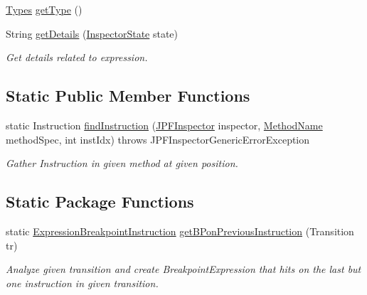 \begin{DoxyCompactItemize}
\hyperlink{enumgov_1_1nasa_1_1jpf_1_1inspector_1_1server_1_1expression_1_1_types}{Types} \hyperlink{classgov_1_1nasa_1_1jpf_1_1inspector_1_1server_1_1expression_1_1_expression_boolean_aed010ff8683eb1e8621e226703133457}{get\+Type} ()
\item 
String \hyperlink{classgov_1_1nasa_1_1jpf_1_1inspector_1_1server_1_1expression_1_1_expression_boolean_a43423e204404f24bf7862de938598eb7}{get\+Details} (\hyperlink{interfacegov_1_1nasa_1_1jpf_1_1inspector_1_1server_1_1expression_1_1_inspector_state}{Inspector\+State} state)
\begin{DoxyCompactList}\small\item\em Get details related to expression. \end{DoxyCompactList}\end{DoxyCompactItemize}
\subsection*{Static Public Member Functions}
\begin{DoxyCompactItemize}
\item 
static Instruction \hyperlink{classgov_1_1nasa_1_1jpf_1_1inspector_1_1server_1_1expression_1_1expressions_1_1_expression_breakpoint_instruction_a476e950464ce07f252c1e6e26a138758}{find\+Instruction} (\hyperlink{classgov_1_1nasa_1_1jpf_1_1inspector_1_1server_1_1jpf_1_1_j_p_f_inspector}{J\+P\+F\+Inspector} inspector, \hyperlink{classgov_1_1nasa_1_1jpf_1_1inspector_1_1utils_1_1expressions_1_1_method_name}{Method\+Name} method\+Spec, int inst\+Idx)  throws J\+P\+F\+Inspector\+Generic\+Error\+Exception 
\begin{DoxyCompactList}\small\item\em Gather Instruction in given method at given position. \end{DoxyCompactList}\end{DoxyCompactItemize}
\subsection*{Static Package Functions}
\begin{DoxyCompactItemize}
\item 
static \hyperlink{classgov_1_1nasa_1_1jpf_1_1inspector_1_1server_1_1expression_1_1expressions_1_1_expression_breakpoint_instruction}{Expression\+Breakpoint\+Instruction} \hyperlink{classgov_1_1nasa_1_1jpf_1_1inspector_1_1server_1_1expression_1_1expressions_1_1_expression_breakpoint_instruction_a2f86483d04e2c104c2625469c201e9d4}{get\+B\+Pon\+Previous\+Instruction} (Transition tr)
\begin{DoxyCompactList}\small\item\em Analyze given transition and create Breakpoint\+Expression that hits on the last but one instruction in given transition. \end{DoxyCompactList}\end{DoxyCompactItemize}
